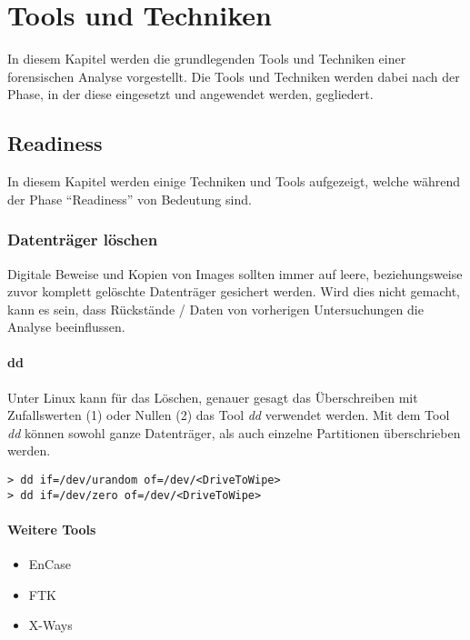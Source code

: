 \chapter{Tools und Techniken} \label{chap:ToolsTechniques}
In diesem Kapitel werden die grundlegenden Tools und Techniken einer forensischen Analyse vorgestellt. Die Tools und Techniken werden dabei nach der Phase, in der diese eingesetzt und angewendet werden, gegliedert.




\section{Readiness}
In diesem Kapitel werden einige Techniken und Tools aufgezeigt, welche während der Phase "`Readiness"' von Bedeutung sind.


\subsection{Datenträger löschen}
Digitale Beweise und Kopien von Images sollten immer auf leere, beziehungsweise zuvor komplett gelöschte Datenträger gesichert werden. Wird dies nicht gemacht, kann es sein, dass Rückstände / Daten von vorherigen Untersuchungen die Analyse beeinflussen.

\subsubsection{dd}
Unter Linux kann für das Löschen, genauer gesagt das Überschreiben mit Zufallswerten (1) oder Nullen (2) das Tool \textit{dd} verwendet werden.
Mit dem Tool \textit{dd} können sowohl ganze Datenträger, als auch einzelne Partitionen überschrieben werden.

\begin{lstlisting}
> dd if=/dev/urandom of=/dev/<DriveToWipe>
> dd if=/dev/zero of=/dev/<DriveToWipe>
\end{lstlisting}

\subsubsection{Weitere Tools}
\begin{itemize}
\item EnCase
\item FTK
\item X-Ways
\end{itemize}




